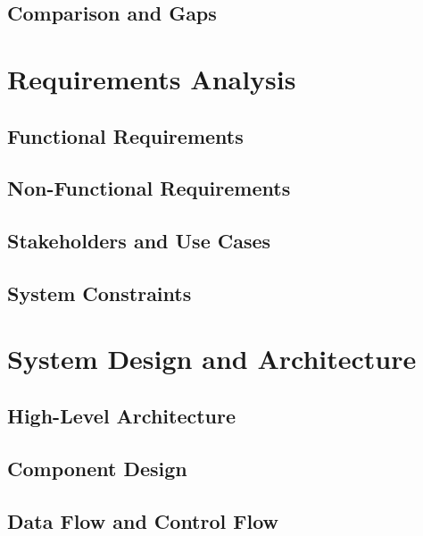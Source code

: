 \documentclass[conference, onecolumn]{IEEEtran}
\begin{document}
  \subsection{Comparison and Gaps}
  \label{subsec:related-comparison}



  \section{Requirements Analysis}
  \label{subsec:requirements}

  \subsection{Functional Requirements}
  \label{subsec:functional-requirements}

  \subsection{Non-Functional Requirements}
  \label{subsec:non-functional-requirements}

  \subsection{Stakeholders and Use Cases}
  \label{subsec:stakeholders}

  \subsection{System Constraints}
  \label{subsec:system-constraints}



  \section{System Design and Architecture}
  \label{sec:system-design}

  \subsection{High-Level Architecture}
  \label{subsec:high-level-architecture}

  \subsection{Component Design}
  \label{subsec:component-design}

  \subsection{Data Flow and Control Flow}
  \label{subsec:data-flow}
\end{document}
